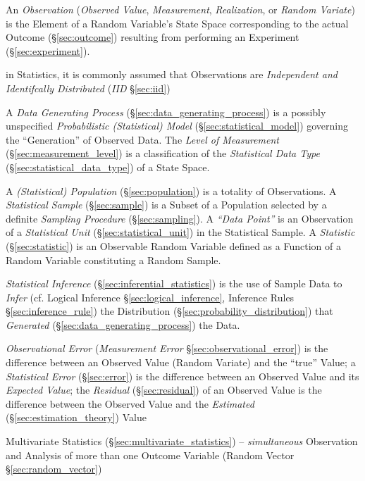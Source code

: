 An \emph{Observation} (\emph{Observed Value}, \emph{Measurement},
\emph{Realization}, or \emph{Random Variate}) is the Element of a Random
Variable's State Space corresponding to the actual Outcome (\S\ref{sec:outcome})
resulting from performing an Experiment (\S\ref{sec:experiment}).

in Statistics, it is commonly assumed that Observations are \emph{Independent
  and Identifcally Distributed} (\emph{IID} \S\ref{sec:iid})

\fist A \emph{Data Generating Process} (\S\ref{sec:data_generating_process})
is a possibly unspecified \emph{Probabilistic (Statistical) Model}
(\S\ref{sec:statistical_model}) governing the ``Generation'' of Observed Data.
The \emph{Level of Measurement} (\S\ref{sec:measurement_level}) is a
classification of the \emph{Statistical Data Type}
(\S\ref{sec:statistical_data_type}) of a State Space.

\fist A \emph{(Statistical) Population} (\S\ref{sec:population}) is a totality
of Observations. A \emph{Statistical Sample} (\S\ref{sec:sample}) is
a Subset of a Population selected by a definite \emph{Sampling Procedure}
(\S\ref{sec:sampling}). A \emph{``Data Point''} is an Observation of a
\emph{Statistical Unit} (\S\ref{sec:statistical_unit}) in the Statistical
Sample. A \emph{Statistic} (\S\ref{sec:statistic}) is an Observable Random
Variable defined as a Function of a Random Variable constituting a Random
Sample.

\fist \emph{Statistical Inference} (\S\ref{sec:inferential_statistics}) is the
use of Sample Data to \emph{Infer} (cf. Logical Inference
\S\ref{sec:logical_inference}, Inference Rules \S\ref{sec:inference_rule}) the
Distribution (\S\ref{sec:probability_distribution}) that \emph{Generated}
(\S\ref{sec:data_generating_process}) the Data.

\fist \emph{Observational Error} (\emph{Measurement Error}
\S\ref{sec:observational_error}) is the
difference between an Observed Value (Random Variate) and the ``true'' Value;
a \emph{Statistical Error} (\S\ref{sec:error}) is the difference between an
Observed Value and its \emph{Expected Value};
the \emph{Residual} (\S\ref{sec:residual}) of an Observed Value is the
difference between the Observed Value and the \emph{Estimated}
(\S\ref{sec:estimation_theory}) Value

\fist Multivariate Statistics (\S\ref{sec:multivariate_statistics}) --
\emph{simultaneous} Observation and Analysis of more than one Outcome Variable
(Random Vector \S\ref{sec:random_vector})

